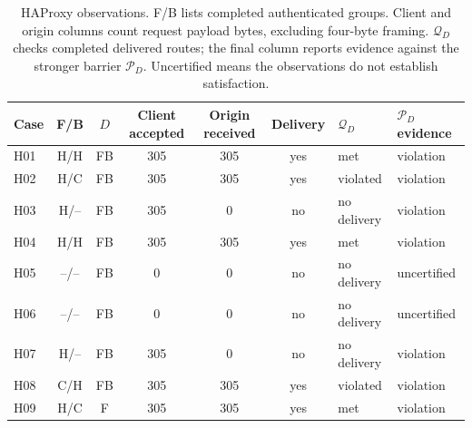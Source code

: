 \begin{table}[t]\centering\small
\caption{HAProxy observations. F/B lists completed authenticated groups. Client and origin columns count request payload bytes, excluding four-byte framing. $\mathcal Q_D$ checks completed delivered routes; the final column reports evidence against the stronger barrier $\mathcal P_D$. Uncertified means the observations do not establish satisfaction.}
\label{tab:gateway}
\begin{tabular}{@{}lcccccll@{}}\toprule
Case & F/B & $D$ & Client accepted & Origin received & Delivery & $\mathcal Q_D$ & $\mathcal P_D$ evidence \\ \midrule
H01 & H/H & FB & 305 & 305 & yes & met & violation \\
H02 & H/C & FB & 305 & 305 & yes & violated & violation \\
H03 & H/-- & FB & 305 & 0 & no & no delivery & violation \\
H04 & H/H & FB & 305 & 305 & yes & met & violation \\
H05 & --/-- & FB & 0 & 0 & no & no delivery & uncertified \\
H06 & --/-- & FB & 0 & 0 & no & no delivery & uncertified \\
H07 & H/-- & FB & 305 & 0 & no & no delivery & violation \\
H08 & C/H & FB & 305 & 305 & yes & violated & violation \\
H09 & H/C & F & 305 & 305 & yes & met & violation \\
\bottomrule\end{tabular}
\end{table}
